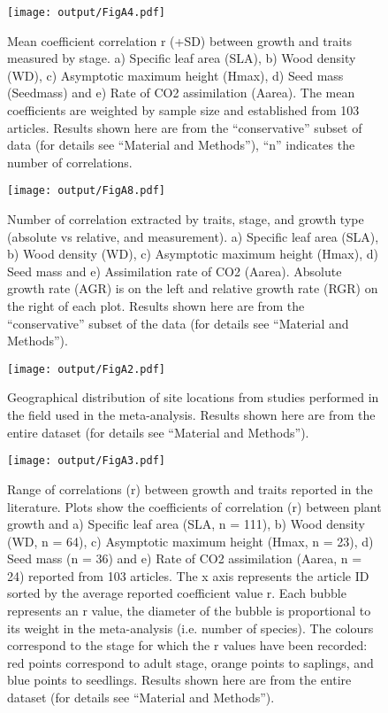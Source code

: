 \documentclass[10pt,twoside]{article}\usepackage[]{graphicx}\usepackage[]{color}
\begin{document}
\begin{figure}[h!]
\centering
\texttt{[image: output/FigA4.pdf]}
\caption{Mean coefficient correlation r (+SD) between growth and traits measured by stage.  a) Specific leaf area (SLA), b) Wood density (WD), c) Asymptotic maximum height (Hmax), d) Seed mass (Seedmass) and e) Rate of CO2 assimilation (Aarea). The mean coefficients are weighted by sample size and established from 103 articles. Results shown here are from the ``conservative'' subset of data (for details see ``Material and Methods''), ``n'' indicates the number of correlations.}
\label{fig:figA4}
\end{figure}



\begin{figure}[h!]
\centering
\texttt{[image: output/FigA8.pdf]}
\caption{Number of correlation extracted by traits, stage, and growth type (absolute vs relative, and measurement). a) Specific leaf area (SLA), b) Wood density (WD), c) Asymptotic maximum height (Hmax), d) Seed mass and e) Assimilation rate of CO2 (Aarea). Absolute growth rate (AGR) is on the left and relative growth rate (RGR) on the right of each plot. Results shown here are from the ``conservative'' subset of the data (for details see ``Material and Methods''). }
\label{fig:figA8}
\end{figure}



\begin{figure}[h!]
\centering
\texttt{[image: output/FigA2.pdf]}
\caption{Geographical distribution of site locations from studies performed in the field used in the meta-analysis. Results shown here are from the entire dataset (for details see ``Material and Methods'').}
\label{fig:figA2}
\end{figure}


\begin{figure}[h!]
\centering
\texttt{[image: output/FigA3.pdf]}
\caption{Range of correlations (r) between
growth and traits reported in the literature. Plots show the coefficients of correlation (r)
between plant growth and a) Specific leaf area (SLA, n =
111), b) Wood density (WD, n = 64), c) Asymptotic
maximum height (Hmax, n = 23), d) Seed mass (n = 36) and
e) Rate of CO2 assimilation (Aarea, n = 24) reported from 103
articles. The x axis represents the article ID sorted by the average reported coefficient value r. Each bubble represents an r value, the diameter of the bubble is proportional to its weight in the meta-analysis (i.e. number of species). The colours correspond to the stage for which the r values have been recorded: red points correspond to adult stage, orange points to saplings, and blue points to seedlings. Results shown here are from the entire dataset (for details see ``Material and Methods''). }
\label{fig:figA3}
\end{figure}
\end{document}
